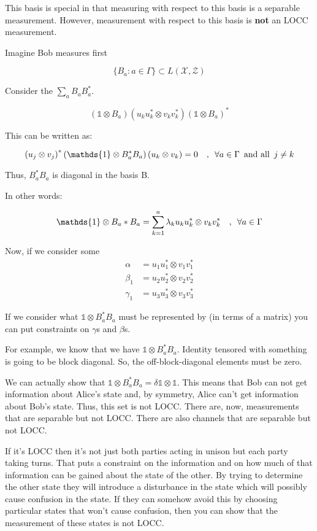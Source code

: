 \documentclass{article}
\begin{document}
This basis is special in that measuring with respect to this basis is a
separable measurement. However, measurement with respect to this basis is
\textbf{not} an LOCC measurement.

Imagine Bob measures first

\[ 
    \{B_a : a \in \Gamma \} \subset L(\mathcal{X}, \mathcal{Z}) 
\]

Consider the $\sum_a B_a B_a^*$.

\[ 
    \left( \mathds{1} \otimes B_a \right) \left( u_k u_k^* \otimes v_k v_k^*
    \right) \left( \mathds{1} \otimes B_a \right) ^*
\]

This can be written as:

\[ 
    \left( u_j \otimes v_j \right)^* \left( \mathds{1}\otimes B_a^* B_a \right)
    \left( u_k \otimes v_k \right) = 0 \quad,\enskip \forall a \in \Gamma
    \enskip \text{and all} \enskip j \ne k
\]

Thus, $B_a^* B_a$ is diagonal in the basis B.

In other words:

\[ 
    \mathds{1} \otimes B_a* B_a = \sum_{k=1}^a \lambda_k u_k u_k^* \otimes v_k
    v_k^* \quad,\enskip \forall a \in \Gamma 
\]

Now, if we consider some 
\begin{align*}
    \alpha &= u_1 u_1^* \otimes v_1 v_1^* \\
    \beta_1 &= u_2 u_2^* \otimes v_2 v_2^* \\
    \gamma_1 &= u_3 u_3^* \otimes v_3 v_3^*
\end{align*}

If we consider what $\mathds{1} \otimes B_a^* B_a$ must be represented by (in
terms of a matrix) you can put constraints on $\gamma$s and $\beta$s.

For example, we know that we have $\mathds{1}\otimes B_a^* B_a$. Identity tensored with
something is going to be block diagonal. So, the off-block-diagonal elements
must be zero.

We can actually show that $\mathds{1}\otimes B_a^* B_a = \delta
\mathds{1}\otimes \mathds{1}$. This means that Bob can not get information about
Alice's state and, by symmetry, Alice can't get information about Bob's state.
Thus, this set is not LOCC. There are, now, measurements that are separable but
not LOCC. There are also channels that are separable but not LOCC.

If it's LOCC then it's not just both parties acting in unison but each party
taking turns. That puts a constraint on the information and on how much of that
information can be gained about the state of the other. By trying to determine
the other state they will introduce a disturbance in the state which will
possibly cause confusion in the state. If they can somehow avoid this by
choosing particular states that won't cause confusion, then you can show that
the measurement of these states is not LOCC.
\end{document}
